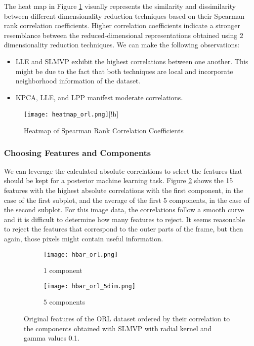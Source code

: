 The heat map in Figure \ref{fig:heatmap-orl} visually represents the similarity and dissimilarity between different dimensionality reduction techniques based on their Spearman rank correlation coefficients. Higher correlation coefficients indicate a stronger resemblance between the reduced-dimensional representations obtained using 2 dimensionality reduction techniques. We can make the following observations:

\begin{itemize}
    \item LLE and SLMVP exhibit the highest correlations between one another. This might be due to the fact that both techniques are local and incorporate neighborhood information of the dataset.
    \item KPCA, LLE, and LPP manifest moderate correlations.
\end{itemize}

\begin{figure}
    \centering
    \texttt{[image: heatmap\_orl.png]}[!h]
    \caption{Heatmap of Spearman Rank Correlation Coefficients}
    \label{fig:heatmap-orl}
\end{figure}

\subsubsection{Choosing Features and Components}

We can leverage the calculated absolute correlations to select the features that should be kept for a posterior machine learning task. Figure \ref{fig:hbar-orl} shows the 15 features with the highest absolute correlations with the first component, in the case of the first subplot, and the average of the first 5 components, in the case of the second subplot. For this image data, the correlations follow a smooth curve and it is difficult to determine how many features to reject. It seems reasonable to reject the features that correspond to the outer parts of the frame, but then again, those pixels might contain useful information.

\begin{figure}[!ht]
    \centering
    \begin{subfigure}{.5\textwidth}
        \centering
        \texttt{[image: hbar\_orl.png]}
        \caption{1 component}
    \end{subfigure}%
    \begin{subfigure}{.5\textwidth}
        \centering
        \texttt{[image: hbar\_orl\_5dim.png]}
        \caption{5 components}
    \end{subfigure}
    \caption{Original features of the ORL dataset ordered by their correlation to the components obtained with SLMVP with radial kernel and gamma values 0.1.}
    \label{fig:hbar-orl}
\end{figure}